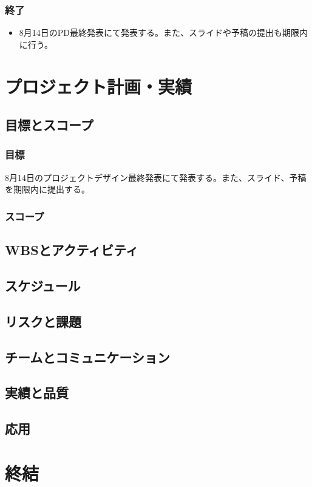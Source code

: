 \documentclass[11pt,a4paper]{jsarticle}
\begin{document}
\subsubsection{終了}
\begin{itemize}
\item 8月14日のPD最終発表にて発表する。また、スライドや予稿の提出も期限内に行う。
\end{itemize}


\section{プロジェクト計画・実績}
\subsection{目標とスコープ}
\subsubsection{目標}
8月14日のプロジェクトデザイン最終発表にて発表する。また、スライド、予稿を期限内に提出する。
\subsubsection{スコープ}

\subsection{WBSとアクティビティ}
\subsection{スケジュール}
\subsection{リスクと課題}
\subsection{チームとコミュニケーション}
\subsection{実績と品質}
\subsection{応用}
\section{終結}
\end{document}
